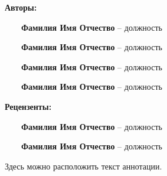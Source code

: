 \documentclass[12pt, a4paper]{book}%
\begin{document}
{\large%
\begin{flushleft}%
 {\bf\color{red} Авторы:}%


~~~~{\bf Фамилия Имя Отчество} -- должность


~~~~{\bf Фамилия Имя Отчество} -- должность

~~~~{\bf Фамилия Имя Отчество} -- должность

~~~~{\bf Фамилия Имя Отчество} -- должность


\vspace{10mm}%

{\bf\color{red}Рецензенты:}%

~~~~{\bf Фамилия Имя Отчество} -- должность

 ~~~~{\bf Фамилия Имя Отчество} -- должность
\end{flushleft}%

\vspace{10mm}%

 Здесь можно расположить текст аннотации.


\newpage%



}
\end{document}
